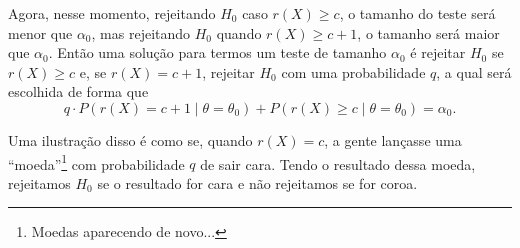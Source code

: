 \documentclass{article}
\begin{document}
Agora, nesse momento, rejeitando $H_0$ caso $r(X) \geq c$, o tamanho do teste será menor que $\alpha_0$, mas rejeitando $H_0$ quando $r(X) \geq c + 1$, o tamanho será maior que $\alpha_0$. Então uma solução para termos um teste de tamanho $\alpha_0$ é rejeitar $H_0$ se $r(X) \geq c$ e, se $r(X) = c + 1$, rejeitar $H_0$ com uma probabilidade $q$, a qual será escolhida de forma que
\[q\cdot P(r(X) = c + 1 \mid \theta = \theta_0) + P(r(X) \geq c \mid \theta = \theta_0) = \alpha_0.\]

Uma ilustração disso é como se, quando $r(X) = c$, a gente lançasse uma ``moeda''\footnote{Moedas aparecendo de novo...} com probabilidade $q$ de sair cara. Tendo o resultado dessa moeda, rejeitamos $H_0$ se o resultado for cara e não rejeitamos se for coroa.

\printbibliography
\end{document}
